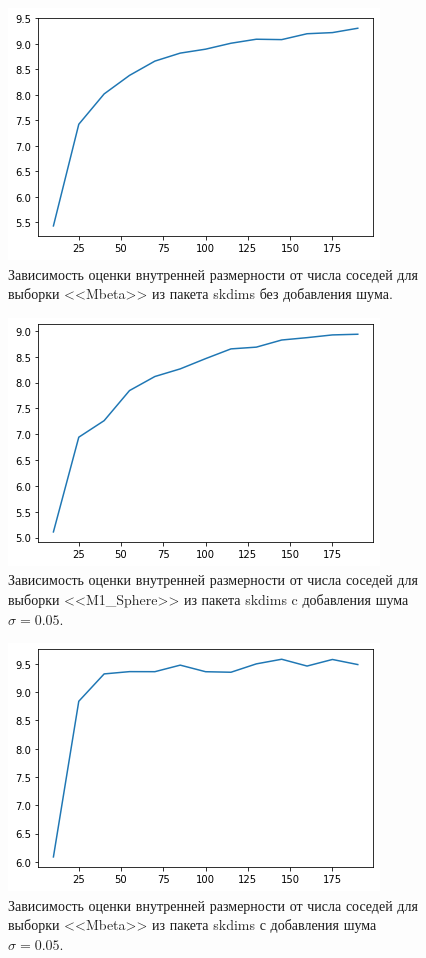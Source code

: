 \documentclass[english, russian]{sobraep}
\begin{document}
\begin{figure}[H]
    \includegraphics[scale=0.5]{gr2.png}
    \centering
    \caption{Зависимость оценки внутренней размерности от числа соседей для выборки <<Mbeta>> из пакета skdims без добавления шума.}
    \label{fig:fig1}
\end{figure}

\begin{figure}[H]
    \includegraphics[scale=0.5]{gr3.png}
    \centering
    \caption{Зависимость оценки внутренней размерности от числа соседей для выборки <<M1\_Sphere>> из пакета skdims c добавления шума $\sigma = 0.05$.}
    \label{fig:fig1}
\end{figure}

\begin{figure}[H]
    \includegraphics[scale=0.5]{gr4.png}
    \centering
    \caption{Зависимость оценки внутренней размерности от числа соседей для выборки <<Mbeta>> из пакета skdims с добавления шума $\sigma = 0.05$.}
    \label{fig:fig1}
\end{figure}
\end{document}
